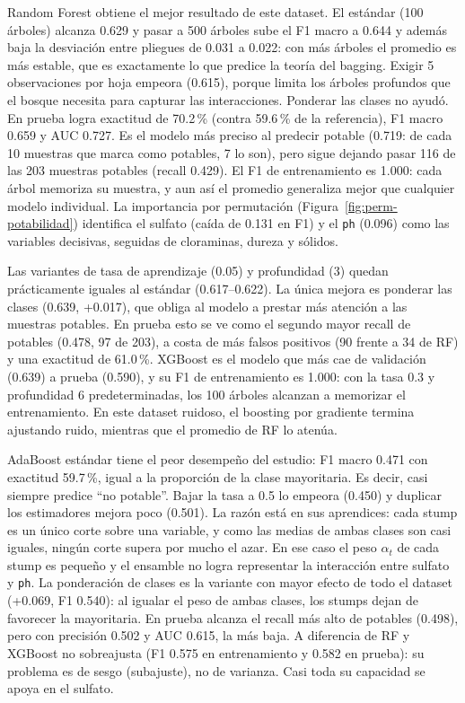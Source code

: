 Random Forest obtiene el mejor resultado de este dataset. El estándar (100 árboles)
alcanza 0.629 y pasar a 500 árboles sube el F1 macro a 0.644 y además baja la
desviación entre pliegues de 0.031 a 0.022: con más árboles el promedio es más estable,
que es exactamente lo que predice la teoría del bagging. Exigir 5 observaciones por
hoja empeora (0.615), porque limita los árboles profundos que el bosque necesita para
capturar las interacciones. Ponderar las clases no ayudó. En prueba logra exactitud de
70.2\,\% (contra 59.6\,\% de la referencia), F1 macro 0.659 y AUC 0.727. Es el modelo
más preciso al predecir potable (0.719: de cada 10 muestras que marca como potables,
7 lo son), pero sigue dejando pasar 116 de las 203 muestras potables (recall 0.429).
El F1 de entrenamiento es 1.000: cada árbol memoriza su muestra, y aun así el promedio
generaliza mejor que cualquier modelo individual. La importancia por permutación
(Figura~\ref{fig:perm-potabilidad}) identifica el sulfato (caída de 0.131 en F1) y el
\texttt{ph} (0.096) como las variables decisivas, seguidas de cloraminas, dureza y
sólidos.

Las variantes de tasa de aprendizaje (0.05) y profundidad (3) quedan prácticamente
iguales al estándar (0.617--0.622). La única mejora es ponderar las clases (0.639,
+0.017), que obliga al modelo a prestar más atención a las muestras potables. En
prueba esto se ve como el segundo mayor recall de potables (0.478, 97 de 203), a costa
de más falsos positivos (90 frente a 34 de RF) y una exactitud de 61.0\,\%. XGBoost es
el modelo que más cae de validación (0.639) a prueba (0.590), y su F1 de entrenamiento
es 1.000: con la tasa 0.3 y profundidad 6 predeterminadas, los 100 árboles alcanzan a
memorizar el entrenamiento. En este dataset ruidoso, el boosting por gradiente termina
ajustando ruido, mientras que el promedio de RF lo atenúa.

AdaBoost estándar tiene el peor desempeño del estudio: F1 macro 0.471 con exactitud
59.7\,\%, igual a la proporción de la clase mayoritaria. Es decir, casi siempre
predice ``no potable''. Bajar la tasa a 0.5 lo empeora (0.450) y duplicar los
estimadores mejora poco (0.501). La razón está en sus aprendices: cada stump es un
único corte sobre una variable, y como las medias de ambas clases son casi iguales,
ningún corte supera por mucho el azar. En ese caso el peso $\alpha_t$ de cada stump es
pequeño y el ensamble no logra representar la interacción entre sulfato
y \texttt{ph}. La ponderación de clases es la variante con mayor efecto de todo el
dataset (+0.069, F1 0.540): al igualar el peso de ambas clases, los stumps dejan de
favorecer la mayoritaria. En prueba alcanza el recall más alto de potables (0.498),
pero con precisión 0.502 y AUC 0.615, la más baja. A diferencia de RF y XGBoost no
sobreajusta (F1 0.575 en entrenamiento y 0.582 en prueba): su problema es de sesgo
(subajuste), no de varianza. Casi toda su capacidad se apoya en el sulfato.

